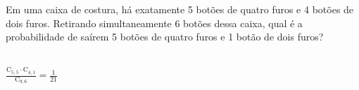 \begin{ex}
Em uma caixa de costura, há exatamente 5 botões de quatro furos e 4 botões de dois furos. Retirando simultaneamente 6 botões dessa caixa, qual é a probabilidade de saírem 5 botões de quatro furos e 1 botão de dois furos?
   \begin{sol}
      \phantom{A} \\
      $\frac{\mathrm{C}_{5,5}\cdot\mathrm{C}_{4,1}}{\mathrm{C}_{9,6}}=\frac{1}{21}$
   \end{sol}
\end{ex}